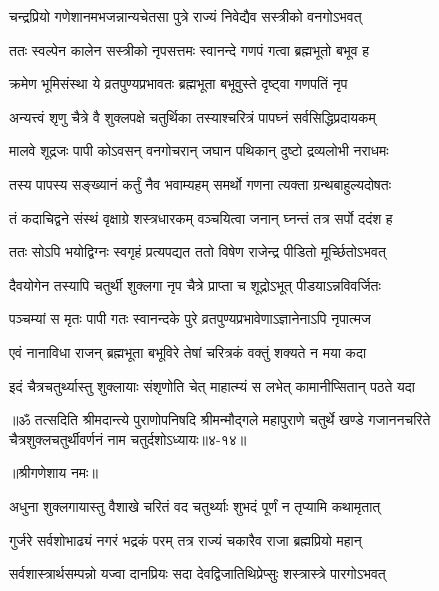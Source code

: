 \twolineshloka
{चन्द्रप्रियो गणेशानमभजन्नान्यचेतसा}
{पुत्रे राज्यं निवेद्यैव सस्त्रीको वनगोऽभवत्} %

\twolineshloka
{ततः स्वल्पेन कालेन सस्त्रीको नृपसत्तमः}
{स्वानन्दे गणपं गत्वा ब्रह्मभूतो बभूव ह} %

\twolineshloka
{क्रमेण भूमिसंस्था ये व्रतपुण्यप्रभावतः}
{ब्रह्मभूता बभूवुस्ते दृष्ट्वा गणपतिं नृप} %

\twolineshloka
{अन्यत्त्वं श‍ृणु चैत्रे वै शुक्लपक्षे चतुर्थिका}
{तस्याश्चरित्रं पापघ्नं सर्वसिद्धिप्रदायकम्} %

\twolineshloka
{मालवे शूद्रजः पापी कोऽवसन् वनगोचरान्}
{जघान पथिकान् दुष्टो द्रव्यलोभी नराधमः} %

\twolineshloka
{तस्य पापस्य सङ्ख्यानं कर्तुं नैव भवाम्यहम्}
{समर्थो गणना त्यक्ता ग्रन्थबाहुल्यदोषतः} %

\twolineshloka
{तं कदाचिद्वने संस्थं वृक्षाग्रे शस्त्रधारकम्}
{वञ्चयित्वा जनान् घ्नन्तं तत्र सर्पो ददंश ह} %

\twolineshloka
{ततः सोऽपि भयोद्विग्नः स्वगृहं प्रत्यपद्यत}
{ततो विषेण राजेन्द्र पीडितो मूर्च्छितोऽभवत्} %

\twolineshloka
{दैवयोगेन तस्यापि चतुर्थी शुक्लगा नृप}
{चैत्रे प्राप्ता च शूद्रोऽभूत् पीडयाऽन्नविवर्जितः} %

\twolineshloka
{पञ्चम्यां स मृतः पापी गतः स्वानन्दके पुरे}
{व्रतपुण्यप्रभावेणाऽज्ञानेनाऽपि नृपात्मज} %

\twolineshloka
{एवं नानाविधा राजन् ब्रह्मभूता बभूविरे}
{तेषां चरित्रकं वक्तुं शक्यते न मया कदा} %

\twolineshloka
{इदं चैत्रचतुर्थ्यास्तु शुक्लायाः संश‍ृणोति चेत्}
{माहात्म्यं स लभेत् कामानीप्सितान् पठते यदा} %

॥ॐ तत्सदिति श्रीमदान्त्ये पुराणोपनिषदि श्रीमन्मौद्गले महापुराणे चतुर्थे खण्डे गजाननचरिते चैत्रशुक्लचतुर्थीवर्णनं नाम चतुर्दशोऽध्यायः॥४-१४॥


\label{sec:vaishakha-shukla-chaturthi-mahatmya-varnanam}

\centerline{॥श्रीगणेशाय नमः॥}


\twolineshloka
{अधुना शुक्लगायास्तु वैशाखे चरितं वद}
{चतुर्थ्याः शुभदं पूर्णं न तृप्यामि कथामृतात्} %


\twolineshloka
{गुर्जरे सर्वशोभाढ्यं नगरं भद्रकं परम्}
{तत्र राज्यं चकारैव राजा ब्रह्मप्रियो महान्} %

\twolineshloka
{सर्वशास्त्रार्थसम्पन्नो यज्वा दानप्रियः सदा}
{देवद्विजातिथिप्रेप्सुः शस्त्रास्त्रे पारगोऽभवत्} %

